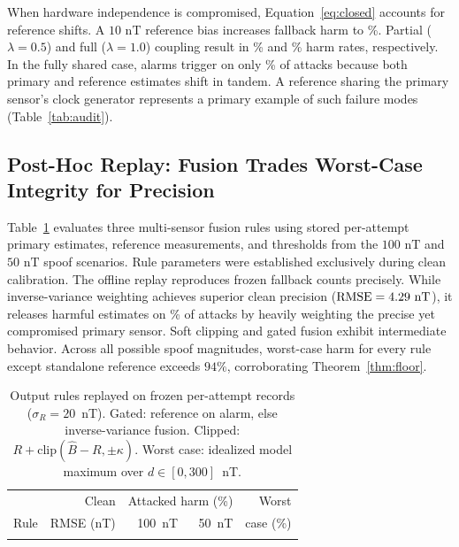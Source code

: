 \documentclass[conference]{IEEEtran}
\newcommand{\Bhat}{\widehat{B}}
\begin{document}
When hardware independence is compromised, Equation~\eqref{eq:closed} accounts for reference shifts. A $10\text{~nT}$ reference bias increases fallback harm to \ObsBiasHarmRate\%. Partial ($\lambda = 0.5$) and full ($\lambda = 1.0$) coupling result in \HalfHarmRate\% and \FullHarmRate\% harm rates, respectively. In the fully shared case, alarms trigger on only \FullAlarmRate\% of attacks because both primary and reference estimates shift in tandem. A reference sharing the primary sensor's clock generator represents a primary example of such failure modes (Table~\ref{tab:audit}).

\subsection{Post-Hoc Replay: Fusion Trades Worst-Case Integrity for Precision}
\label{sec:results-fusion}

Table~\ref{tab:fusion} evaluates three multi-sensor fusion rules using stored per-attempt primary estimates, reference measurements, and thresholds from the $100\text{~nT}$ and $50\text{~nT}$ spoof scenarios. Rule parameters were established exclusively during clean calibration. The offline replay reproduces frozen fallback counts precisely. While inverse-variance weighting achieves superior clean precision ($\text{RMSE} = 4.29\text{~nT}$), it releases harmful estimates on \ObsIVWAttack\% of attacks by heavily weighting the precise yet compromised primary sensor. Soft clipping and gated fusion exhibit intermediate behavior. Across all possible spoof magnitudes, worst-case harm for every rule except standalone reference exceeds $94\%$, corroborating Theorem~\ref{thm:floor}.

\begin{table}[t]
\centering
\caption{Output rules replayed on frozen per-attempt records ($\sigma_R=20$~nT). Gated: reference on alarm, else inverse-variance fusion. Clipped: $R+\mathrm{clip}(\Bhat-R,\pm\kappa)$. Worst case: idealized model maximum over $d\in[0,300]$~nT.}
\label{tab:fusion}
\footnotesize
\setlength{\tabcolsep}{3pt}
\begin{tabular}{@{}lrrrr@{}}
\toprule
& Clean & \multicolumn{2}{c}{Attacked harm (\%)} & Worst \\
Rule & RMSE (nT) & 100~nT & 50~nT & case (\%) \\
\midrule

\\
\bottomrule
\end{tabular}
\end{table}
\end{document}
